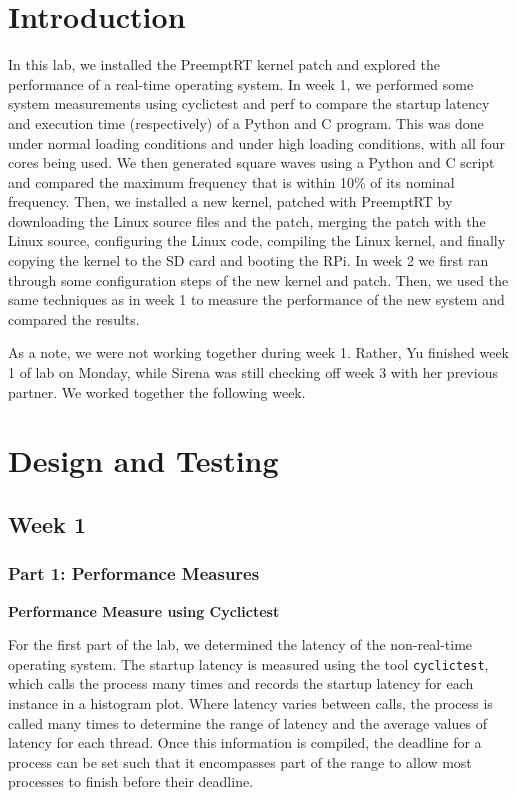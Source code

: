 \documentclass[a4paper,10pt]{article}
\newcommand{\code}[1]{\colorbox{light-gray}{\texttt{#1}}}
\begin{document}
\tableofcontents

\newpage


\section{Introduction}

In this lab, we installed the PreemptRT kernel patch and explored the performance of a real-time operating system. In week 1, we performed some system measurements using cyclictest and perf to compare the startup latency and execution time (respectively) of a Python and C program. This was done under normal loading conditions and under high loading conditions, with all four cores being used. We then generated square waves using a Python and C script and compared the maximum frequency that is within 10\% of its nominal frequency. Then, we installed a new kernel, patched with PreemptRT by downloading the Linux source files and the patch, merging the patch with the Linux source, configuring the Linux code, compiling the Linux kernel, and finally copying the kernel to the SD card and booting the RPi. In week 2 we first ran through some configuration steps of the new kernel and patch. Then, we used the same techniques as in week 1 to measure the performance of the new system and compared the results.

As a note, we were not working together during week 1. Rather, Yu finished week 1 of lab on Monday, while Sirena was still checking off week 3 with her previous partner. We worked together the following week. 


\section{Design and Testing}

\subsection{Week 1}

\subsubsection{Part 1: Performance Measures}

\textbf{Performance Measure using Cyclictest}

For the first part of the lab, we determined the latency of the non-real-time operating system. The startup latency is measured using the tool \code{cyclictest}, which calls the process many times and records the startup latency for each instance in a histogram plot. Where latency varies between calls, the process is called many times to determine the range of latency and the average values of latency for each thread. Once this information is compiled, the deadline for a process can be set such that it encompasses part of the range to allow most processes to finish before their deadline. 
\end{document}
